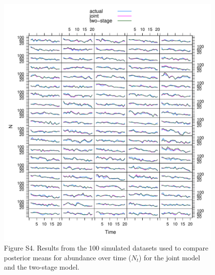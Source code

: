 \documentclass[12pt]{article}
\begin{document}
\begin{figure}[h!]
  \centering
  \includegraphics[width=\textwidth]{sim/sim-Nt}
  \caption{Figure S4. Results from the 100 simulated datasets used to
    compare posterior means for abundance over time
    ($N_t$) for the joint model and the two-stage model. }  
  \label{fig:sim-N}
\end{figure}
\end{document}
